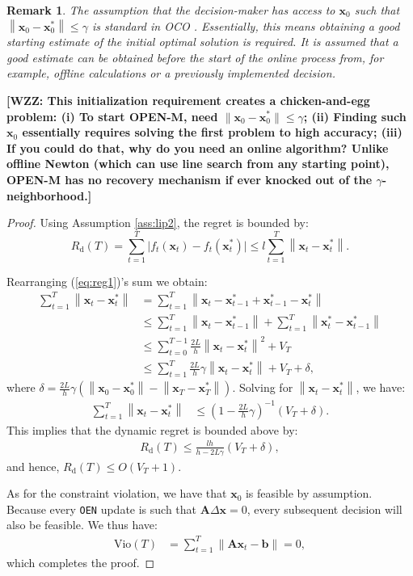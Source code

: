 \documentclass[journal,twoside,web]{ieeecolor}
\newtheorem{remark}{Remark}
\newcommand{\norm}[1]{\left\lVert#1\right\rVert}
\newcommand{\xx}{\mathbf{x}}
\newcommand{\bb}{\mathbf{b}}
\renewcommand{\AA}{\mathbf{A}}
\newcommand{\WZZ}[1]{{\color{red}\bf{[WZZ: #1]}}}
\begin{document}
\begin{remark}
{The assumption that the decision-maker has access to $\xx_0$ such that $\norm{\xx_0-\xx_0^*}\le\gamma$ is standard in OCO \cite{OnlineConvexBandit, OnlineNewton, DynamicPolyak}. Essentially, this means obtaining a good starting estimate of the initial optimal solution is required. It is assumed that a good estimate can be obtained before the start of the online process from, for example, offline calculations or a previously implemented decision.}
\end{remark}
\WZZ{This initialization requirement creates a chicken-and-egg problem:
(i) To start OPEN-M, need $\|\xx_0 - \xx_0^*\| \le \gamma$;
(ii) Finding such $\xx_0$ essentially requires solving the first problem to high accuracy;
(iii) If you could do that, why do you need an online algorithm?
Unlike offline Newton (which can use line search from any starting point),
OPEN-M has no recovery mechanism if ever knocked out of the $\gamma$-neighborhood.}

\begin{proof}
    Using Assumption \ref{ass:lip2}, the regret is bounded by:
\begin{equation}
\label{eq:reg1} R_{\text{d}}(T) =\sum\limits_{t=1}^T\big|f_t(\xx_t)-f_t(\xx_t^*)\big| \le l\sum\limits_{t=1}^T \norm {\xx_t-\xx_t^*}.\end{equation}

Rearranging (\ref{eq:reg1})'s sum we obtain:
\begin{align*}
    \sum\limits_{t=1}^T \norm {\xx_t-\xx_t^*} &=  \sum\limits_{t=1}^T \norm {\xx_t-\xx_{t-1}^*+\xx^*_{t-1}-\xx_t^*}\\
    &\le \sum\limits_{t=1}^T \norm {\xx_t-\xx_{t-1}^*} + \sum\limits_{t=1}^T \norm {\xx_t^*-\xx_{t-1}^*}\\
    &\le \sum\limits_{t=0}^{T-1} \frac{2L}{h}\norm{\xx_t-\xx_t^*}^2 + V_T\\
    &\le \sum\limits_{t=1}^{T} \frac{2L}{h}\gamma\norm{\xx_t-\xx_t^*} + V_T + \delta,
\end{align*}
where $\delta = \frac{2L}{h}\gamma(\norm{\xx_0-\xx_0^*}-\norm{\xx_T-\xx_T^*})$.  Solving for $\norm{\xx_t-\xx_t^*}$, we have:
\begin{align}
\label{eq:reg2}
    \sum\limits_{t=1}^T \norm {\xx_t-\xx_t^*} &\le \left(1-\frac{2L}{h}\gamma\right)^{-1}(V_T+\delta).
\end{align}
This implies that the dynamic regret is bounded above by:
\begin{align*}
    R_{\text{d}}(T) \le \frac{lh}{h-2L\gamma}(V_T+\delta),
\end{align*}
and hence, $R_{\text{d}}(T) \le O(V_T+1)$. 


As for the constraint violation, we have that $\xx_0$ is feasible by assumption. Because every \texttt{OEN} update is such that $\AA\Delta\xx=0$, every subsequent decision will also be feasible. We thus have:
\begin{align*}
    \text{Vio}(T) &= \sum\limits_{t=1}^{T}\norm{\AA\xx_t-\bb}=0,
\end{align*}
which completes the proof.
\end{proof}
\end{document}
